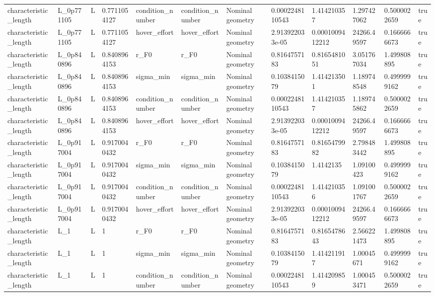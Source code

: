 \begin{tabular}{@{}llllllllllll@{}}
characteristic\_length & L\_0p771105 & L & 0.7711054127 & condition\_number & condition\_number & Nominal geometry & 0.0002248110543 & 1.414210357 & 1.297427062 & 0.5000022659 & true \\
characteristic\_length & L\_0p771105 & L & 0.7711054127 & hover\_effort & hover\_effort & Nominal geometry & 2.913922033e-05 & 0.0001009412212 & 24266.49597 & 0.1666666673 & true \\
characteristic\_length & L\_0p840896 & L & 0.8408964153 & r\_F0 & r\_F0 & Nominal geometry & 0.8164757183 & 0.8165481051 & 3.051767034 & 1.499808895 & true \\
characteristic\_length & L\_0p840896 & L & 0.8408964153 & sigma\_min & sigma\_min & Nominal geometry & 0.1038415079 & 1.414213501 & 1.189748548 & 0.4999999162 & true \\
characteristic\_length & L\_0p840896 & L & 0.8408964153 & condition\_number & condition\_number & Nominal geometry & 0.0002248110543 & 1.414210357 & 1.189745862 & 0.5000022659 & true \\
characteristic\_length & L\_0p840896 & L & 0.8408964153 & hover\_effort & hover\_effort & Nominal geometry & 2.913922033e-05 & 0.0001009412212 & 24266.49597 & 0.1666666673 & true \\
characteristic\_length & L\_0p917004 & L & 0.9170040432 & r\_F0 & r\_F0 & Nominal geometry & 0.8164757183 & 0.8165479982 & 2.798483442 & 1.499808895 & true \\
characteristic\_length & L\_0p917004 & L & 0.9170040432 & sigma\_min & sigma\_min & Nominal geometry & 0.1038415079 & 1.4142135 & 1.09100423 & 0.4999999162 & true \\
characteristic\_length & L\_0p917004 & L & 0.9170040432 & condition\_number & condition\_number & Nominal geometry & 0.0002248110543 & 1.414210356 & 1.091001767 & 0.5000022659 & true \\
characteristic\_length & L\_0p917004 & L & 0.9170040432 & hover\_effort & hover\_effort & Nominal geometry & 2.913922033e-05 & 0.0001009412212 & 24266.49597 & 0.1666666673 & true \\
characteristic\_length & L\_1 & L & 1 & r\_F0 & r\_F0 & Nominal geometry & 0.8164757183 & 0.8165478643 & 2.566221473 & 1.499808895 & true \\
characteristic\_length & L\_1 & L & 1 & sigma\_min & sigma\_min & Nominal geometry & 0.1038415079 & 1.414211917 & 1.00045671 & 0.4999999162 & true \\
characteristic\_length & L\_1 & L & 1 & condition\_number & condition\_number & Nominal geometry & 0.0002248110543 & 1.414209859 & 1.000453471 & 0.5000022659 & true \\

\end{tabular}
